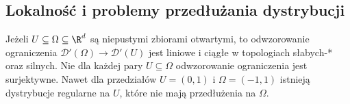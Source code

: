 \subsection{Lokalność i problemy przedłużania dystrybucji}

\begin{twierdzenie}
\label{thm:restriction25}
Jeżeli $U\subseteq\Omega\subseteq\R^d$ są niepustymi
zbiorami otwartymi, to odwzorowanie ograniczenia
$\mathcal D'(\Omega)\to\mathcal D'(U)$ jest liniowe
i ciągłe w topologiach słabych-* oraz silnych.
Nie dla każdej pary $U\subseteq\Omega$ odwzorowanie
ograniczenia jest surjektywne. Nawet dla przedziałów
$U=(0,1)$ i $\Omega=(-1,1)$ istnieją dystrybucje
regularne na $U$, które nie mają przedłużenia na $\Omega$.
\end{twierdzenie}
